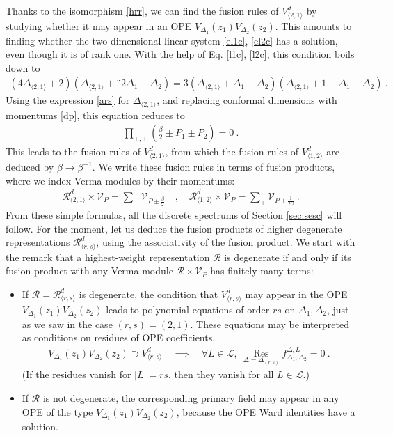 \documentclass[12pt, a4paper]{article}
\theoremstyle{break}
\begin{document}
Thanks to the isomorphism \eqref{hrr}, we can find the fusion rules of $V^d_{\langle 2,1\rangle}$ by studying whether it may appear in an OPE $V_{\Delta_1}(z_1)V_{\Delta_2}(z_2)$. This amounts to finding whether the two-dimensional linear system \eqref{el1c}, \eqref{el2c} has a solution, even though it is of rank one. With the help of Eq. \eqref{l1c}, \eqref{l2c}, this condition boils down to 
\begin{align}
 \left(4\Delta_{\langle 2,1\rangle}+2\right) \left(\Delta_{\langle 2,1\rangle}+¨2\Delta_1-\Delta_2\right) = 3\left(\Delta_{\langle 2,1\rangle}+\Delta_1-\Delta_2\right)\left(\Delta_{\langle 2,1\rangle}+1+\Delta_1-\Delta_2\right)\ .
\end{align}
Using the expression \eqref{ars} for $\Delta_{\langle 2,1\rangle}$, and replacing conformal dimensions with momentums \eqref{dp}, this equation reduces to 
\begin{align}
 \prod_{\pm,\pm}\left(\tfrac{\beta}{2}\pm P_1\pm P_2\right) = 0\ . 
\end{align}
This leads to the fusion rules of $V^d_{\langle 2,1\rangle}$, from which the fusion rules of $V^d_{\langle 1,2\rangle}$ are deduced by $\beta\to \beta^{-1}$. We write these fusion rules in terms of fusion products, where we index Verma modules by their momentums:
\begin{align}
 \boxed{\mathcal{R}^d_{\langle 2,1\rangle}\times \mathcal{V}_P = \sum_\pm \mathcal{V}_{P\pm \frac{\beta}{2}}} \quad, \quad \boxed{\mathcal{R}^d_{\langle 1,2\rangle}\times \mathcal{V}_P = \sum_\pm \mathcal{V}_{P\pm \frac{1}{2\beta}}}\ . 
 \label{rvvp}
\end{align}
From these simple formulas, all the discrete spectrums of Section \ref{sec:sesc} will follow. For the moment, let us deduce the fusion products of higher degenerate representations $\mathcal{R}^d_{\langle r,s\rangle}$, using the associativity of the fusion product. We start with the remark that a highest-weight representation $\mathcal{R}$ is degenerate if and only if its fusion product with any Verma module $\mathcal{R}\times \mathcal{V}_P$ has finitely many terms:
\begin{itemize}
 \item If $\mathcal{R}=\mathcal{R}^d_{\langle r,s\rangle}$ is degenerate, the condition that $V^d_{\langle r,s\rangle}$ may appear in the OPE $V_{\Delta_1}(z_1)V_{\Delta_2}(z_2)$ leads to polynomial equations of order $rs$ on $\Delta_1,\Delta_2$, just as we saw in the case $(r,s)=(2,1)$. These equations may be interpreted as conditions on residues of OPE coefficients,
 \begin{align}
  V_{\Delta_1}(z_1)V_{\Delta_2}(z_2) \supset V^d_{\langle r,s\rangle} \quad \implies \quad \forall L\in \mathcal{L},\ \underset{\Delta=\Delta_{(r,s)}}{\operatorname{Res}} f^{\Delta,L}_{\Delta_1,\Delta_2} = 0\ .
 \end{align}
 (If the residues vanish for $|L|=rs$, then they vanish for all $L\in\mathcal{L}$.)
 \item If $\mathcal{R}$ is not degenerate, the corresponding primary field may appear in any OPE of the type $V_{\Delta_1}(z_1)V_{\Delta_2}(z_2)$, because the OPE Ward identities have a solution. 
\end{itemize}
\end{document}
